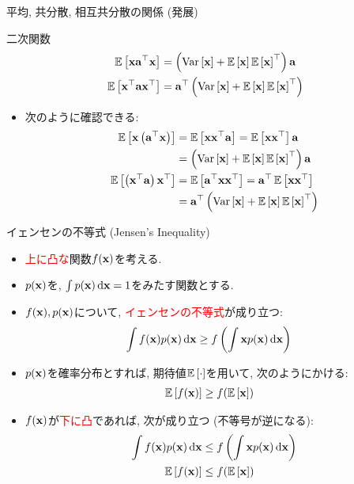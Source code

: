 \documentclass[dvipdfmx,notheorems,t]{beamer}
\begin{document}
\begin{frame}{平均, 共分散, 相互共分散の関係 (発展)}
\begin{block}{二次関数}
  \begin{align*}
    \E{\vb{x} \vb{a}^\top \vb{x}} &= \left( \Var{\vb{x}} + \E{\vb{x}} \E{\vb{x}}^\top \right) \vb{a} \\
    \E{\vb{x}^\top \vb{a} \vb{x}^\top} &= \vb{a}^\top \left( \Var{\vb{x}} + \E{\vb{x}} \E{\vb{x}}^\top \right)
  \end{align*}
\end{block}

\begin{itemize}
  \item 次のように確認できる:
  \begin{align*}
    \E{\vb{x} \left( \vb{a}^\top \vb{x} \right)} &= \E{\vb{x} \vb{x}^\top \vb{a}}
      = \E{\vb{x} \vb{x}^\top} \vb{a} \\
      &= \left( \Var{\vb{x}} + \E{\vb{x}} \E{\vb{x}}^\top \right) \vb{a} \\
    \E{\left( \vb{x}^\top \vb{a} \right) \vb{x}^\top} &= \E{\vb{a}^\top \vb{x} \vb{x}^\top}
      = \vb{a}^\top \E{\vb{x} \vb{x}^\top} \\
      &= \vb{a}^\top \left( \Var{\vb{x}} + \E{\vb{x}} \E{\vb{x}}^\top \right)
  \end{align*}
\end{itemize}
\end{frame}

\begin{frame}{イェンセンの不等式 (Jensen's Inequality)}
\begin{itemize}
  \item \textcolor{red}{上に凸な}関数$f(\vb{x})$を考える.
  \item $p(\vb{x})$を, $\int p(\vb{x}) \dd{\vb{x}} = 1$をみたす関数とする.
  \item $f(\vb{x}), p(\vb{x})$について, \textcolor{red}{イェンセンの不等式}が成り立つ:
  \begin{align*}
    \int f(\vb{x}) p(\vb{x}) \dd{\vb{x}} &\ge f \left( \int \vb{x} p(\vb{x}) \dd{\vb{x}} \right)
  \end{align*}
  \item $p(\vb{x})$を確率分布とすれば, 期待値$\E{\cdot}$を用いて, 次のようにかける:
  \begin{align*}
    \E{f(\vb{x})} &\ge f(\E{\vb{x}})
  \end{align*}
  \item $f(\vb{x})$が\textcolor{red}{下に凸}であれば, 次が成り立つ (不等号が逆になる):
  \begin{align*}
    \int f(\vb{x}) p(\vb{x}) \dd{\vb{x}} &\le f \left( \int \vb{x} p(\vb{x}) \dd{\vb{x}} \right) \\
    \E{f(\vb{x})} &\le f(\E{\vb{x}})
  \end{align*}
\end{itemize}
\end{frame}
\end{document}
